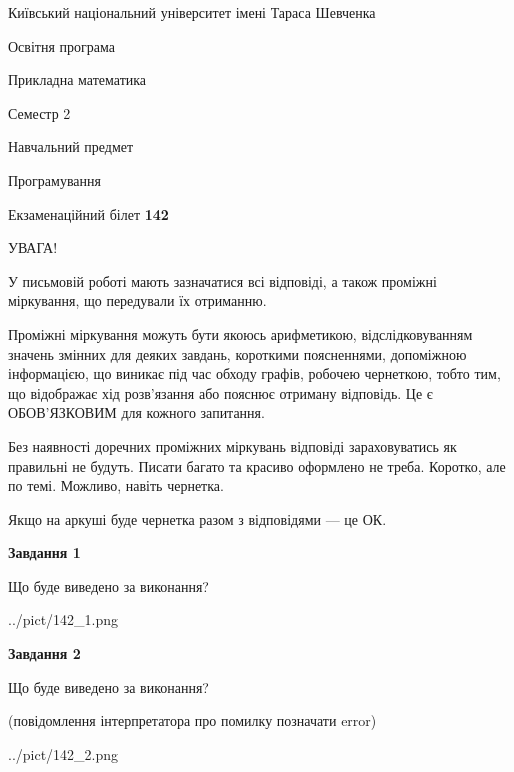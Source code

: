 \documentclass[12pt, ukrainian]{article}
\begin{document}
{{\begin {small}\par
{ \center  Київський національний університет імені Тараса Шевченка \par}
{\parbox {5 cm}{Освітня програма \hfill}{\parbox {7 cm}{Прикладна математика\hfill}}\parbox {6 cm}{\hfill Семестр 2}}\par
{\parbox {5 cm} {Навчальний предмет \hfill}\parbox {7 cm}{Програмування \hfill}\parbox {6cm}{\hfill}\par}\vspace{-7pt} \end{small}}{\center Екзаменаційний білет \No \textbf
{ 142 }\par}}
{
\begin {large}
УВАГА!

У письмовій роботі мають зазначатися всі відповіді, а також проміжні міркування, що передували їх отриманню.

Проміжні міркування можуть бути якоюсь арифметикою, відслідковуванням зна\-чень змінних для деяких завдань,
короткими поясненнями, допоміжною інформацією, що виникає під час обходу графів, робочею чернеткою,
тобто тим, що відображає хід розв’язання або пояснює отриману відповідь.
Це є ОБОВ’ЯЗКОВИМ для кожного запитання.

Без наявності доречних проміжних міркувань відповіді зараховуватись як правиль\-ні не будуть.
Писати багато та красиво оформлено не треба. Коротко, але по темі. Можли\-во, навіть чернетка.

Якщо на аркуші буде чернетка разом з відповідями --- це ОК.

\newpage

{\begin {center}\textbf{Завдання 1}\end {center}}\par
Що буде виведено за виконання?\par
\begin{center}
	{../pict/142_1.png}
\end{center}
\newpage

{\begin {center}\textbf{Завдання 2}\end {center}}\par
Що буде виведено за виконання?\par
 (повідомлення інтерпретатора про помилку позначати error)\par
\begin{center}
	{../pict/142_2.png}
\end{center}
\newpage


\end{large}}
\end{document}
